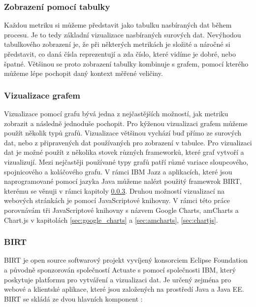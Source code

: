 \documentclass[czech,master,public,dept460,male,cpdeclaration,oneside]{diploma}
\begin{document}

\subsubsection{Zobrazení pomocí tabulky}
Každou metriku si můžeme představit jako tabulku nasbíraných dat během procesu. Je to tedy základní vizualizace nasbíraných surových dat. Nevýhodou tabulkového zobrazení je, že při některých metrikách je složité a náročné si představit, co daná čísla reprezentují a zda číslo, které vidíme je dobré, nebo špatné. Většinou se proto zobrazení tabulky kombinuje s grafem, pomocí kterého můžeme lépe pochopit daný kontext měřené veličiny.

\subsubsection{Vizualizace grafem}
Vizualizace pomocí grafu bývá jedna z nejčastějších možností, jak metriku zobrazit a následně jednoduše pochopit. Pro kýženou vizualizaci grafem můžeme použít několik typů grafů. Vizualizace většinou vychází buď přímo ze surových dat, nebo z připravených dat používaných pro zobrazení v tabulce. Pro vizualizaci dat je možné použít z několika stovek různých frameworků, které graf vytvoří a vizualizují. Mezi nejčastěji používané typy grafů patří různé variace sloupcového, spojnicového a koláčového grafu. V rámci IBM Jazz a aplikacích, které jsou naprogramované pomocí jazyka Java můžeme nalézt použitý framewrok BIRT, kterému se věnuji v rámci kapitoly \ref{sec:birt}. Druhou možností vizualizací na webových stránkách je pomocí JavaScriptové knihovny. V rámci této práce porovnávám tři JavaScriptové knihovny s názvem Google Charts, amCharts a Chart.js v kapitolách \ref{sec:google_charts} a \ref{sec:amcharts}, \ref{sec:chartjs}.

\subsubsection{BIRT}
\label{sec:birt}
BIRT je open source softwarový projekt vyvíjený konsorciem Eclipse Foundation a původně sponzorován společností Actuate s pomocí společnosti IBM, který poskytuje platformu pro vytváření a vizualizaci dat. Je určený zejména pro webové a klientské aplikace, které jsou založených na prostředí Java a Java EE. BIRT se skládá ze dvou hlavních komponent \cite{ref:birt_about}:
\end{document}
